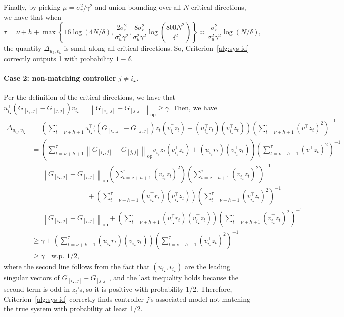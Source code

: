 \documentclass[11pt, twoside]{article}
\theoremstyle{definition}
\newcommand{\norm}[1]{\left\lVert #1 \right\rVert}
\newcommand{\opnorm}[1]{\norm{#1}_{\mathrm{op}}}
\begin{document}
Finally, by picking $\mu = \sigma_r^2 / \gamma^2$ and union bounding over all $N$ critical directions, we have that when
\[\tau = \nu + h + \max\left\{16\log(4N/\delta), \frac{2\sigma_r^2}{\sigma_u^2\gamma^2}, \frac{8\sigma_r^2}{\sigma_u^2 \gamma^2}\log\left(\frac{800 N^2}{\delta^2}\right)\right\} \asymp \frac{\sigma_r^2}{\sigma_u^2 \gamma^2} \log(N / \delta),\]
the quantity $\Delta_{u_k, v_k}$ is small along all critical directions.
So, Criterion~\ref{alg:sys-id} correctly outputs 1 with probability $1-\delta$.


\paragraph{Case 2: non-matching controller $j \neq i_\star$.}

Per the definition of the critical directions, we have that $u_{i_\star}^\top(G_{[i_\star, j]} - G_{[j, j]})v_{i_\star} = \opnorm{G_{[i_\star, j]} - G_{[j, j]}} \ge \gamma$.
Then, we have
\begin{align*}
    \Delta_{u_{i_\star}, v_{i_\star}}
    &= \left(\sum_{t=\nu+h+1}^{\tau} u_{i_\star}^\top ((G_{[i_\star, j]} - G_{[j, j]})z_t (v_{i_\star}^\top z_t) + (u_{i_\star}^\top r_t)(v_{i_\star}^\top z_t)\right) \left(\sum_{t=\nu+h+1}^{\tau} (v^\top z_t)^2 \right)^{-1} \\
    &= \left(\sum_{t=\nu+h+1}^{\tau} \opnorm{G_{[i_\star, j]} - G_{[j, j]}}v_{i_\star}^\top z_t (v_{i_\star}^\top z_t) + (u_{i_\star}^\top r_t)(v_{i_\star}^\top z_t)\right) \left(\sum_{t=\nu+h+1}^{\tau} (v^\top z_t)^2 \right)^{-1} \\
    &= \opnorm{G_{[i_\star, j]} - G_{[j, j]}} \left(\sum_{t=\nu+h+1}^{\tau} (v_{i_\star}^\top z_t)^2\right) \left(\sum_{t=\nu+h+1}^{\tau} (v_{i_\star}^\top z_t)^2 \right)^{-1} \\
    &\hspace{8em}+ \left(\sum_{t=\nu+h+1}^{\tau} (u_{i_\star}^\top r_t)(v_{i_\star}^\top z_t)\right) \left(\sum_{t=\nu+h+1}^{\tau} (v_{i_\star}^\top z_t)^2 \right)^{-1} \\
    &= \opnorm{G_{[i_\star, j]} - G_{[j, j]}} + \left(\sum_{t=\nu+h+1}^{\tau} (u_{i_\star}^\top r_t)(v_{i_\star}^\top z_t)\right) \left(\sum_{t=\nu+h+1}^{\tau} (v_{i_\star}^\top z_t)^2 \right)^{-1} \\
    &\ge \gamma + \left(\sum_{t=\nu+h+1}^{\tau} (u_{i_\star}^\top r_t)(v_{i_\star}^\top z_t)\right) \left(\sum_{t=\nu+h+1}^{\tau} (v_{i_\star}^\top z_t)^2 \right)^{-1} \\
    &\ge \gamma \quad \text{w.p. } 1/2,
\end{align*}
where the second line follows from the fact that $(u_{i_\star}, v_{i_\star})$ are the leading singular vectors of $G_{[i_\star, j]} - G_{[j, j]}$, and the last inequality holds because the second term is odd in $z_t$'s, so it is positive with probability 1/2.
Therefore, Criterion~\ref{alg:sys-id} correctly finds controller $j$'s associated model not matching the true system with probability at least 1/2. 
\end{document}
